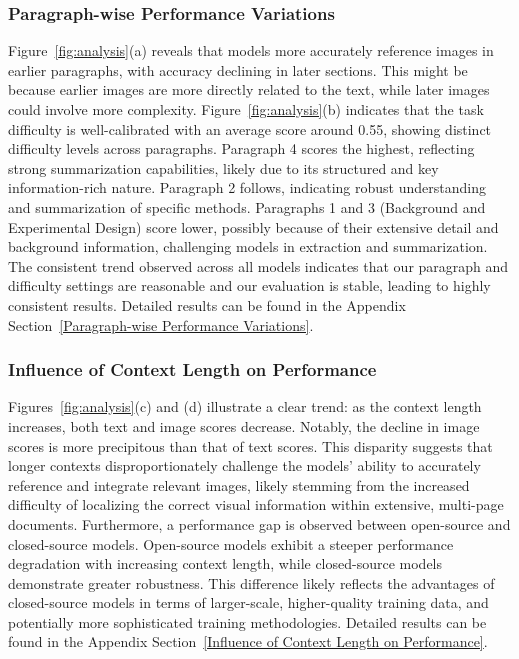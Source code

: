 \subsubsection{Paragraph-wise Performance Variations}
Figure~\ref{fig:analysis}(a) reveals that models more accurately reference images in earlier paragraphs, with accuracy declining in later sections.
This might be because earlier images are more directly related to the text, while later images could involve more complexity. 
Figure~\ref{fig:analysis}(b) indicates that the task difficulty is well-calibrated with an average score around 0.55, showing distinct difficulty levels across paragraphs. 
Paragraph 4 scores the highest, reflecting strong summarization capabilities, likely due to its structured and key information-rich nature.
Paragraph 2 follows, indicating robust understanding and summarization of specific methods.
Paragraphs 1 and 3 (Background and Experimental Design) score lower, possibly because of their extensive detail and background information, challenging models in extraction and summarization.
The consistent trend observed across all models indicates that our paragraph and difficulty settings are reasonable and our evaluation is stable, leading to highly consistent results.
Detailed results can be found in the Appendix Section~\ref{Paragraph-wise Performance Variations}.

\subsubsection{Influence of Context Length on Performance}
Figures~\ref{fig:analysis}(c) and (d) illustrate a clear trend: as the context length increases, both text and image scores decrease. Notably, the decline in image scores is more precipitous than that of text scores. This disparity suggests that longer contexts disproportionately challenge the models' ability to accurately reference and integrate relevant images, likely stemming from the increased difficulty of localizing the correct visual information within extensive, multi-page documents. Furthermore, a performance gap is observed between open-source and closed-source models. Open-source models exhibit a steeper performance degradation with increasing context length, while closed-source models demonstrate greater robustness. This difference likely reflects the advantages of closed-source models in terms of larger-scale, higher-quality training data, and potentially more sophisticated training methodologies.
Detailed results can be found in the Appendix Section~\ref{Influence of Context Length on Performance}.

